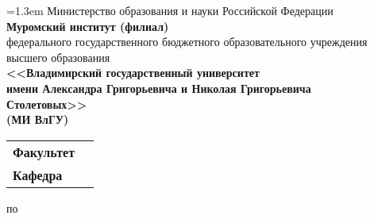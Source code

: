 \newlength{\frontpagefk} %
\setlength{\frontpagefk}{6cm}
\newlength{\frontpagerb} %
\setlength{\frontpagerb}{6cm}
\newlength{\frontpagerbspace} %
\setlength{\frontpagerbspace}{1cm}
\newlength{\FrontPageSubjSpace} %
\setlength{\FrontPageSubjSpace}{1cm}
\newlength{\FrontPageTopicSpace} %
\setlength{\FrontPageTopicSpace}{0.5cm}

\thispagestyle{empty}
\begin{center}
{
\vspace*{-1.5cm}
\baselineskip=1.3em
{\small Министерство образования и науки Российской Федерации}\\
\textbf{Муромский институт (филиал)}\\
{\footnotesize федерального государственного бюджетного образовательного учреждения\\
высшего образования}\\
\textbf{<<Владимирский государственный университет\\
имени Александра Григорьевича и Николая Григорьевича\\
Столетовых>>\\
(МИ ВлГУ)\\}
}

\bigskip
\begin{tabular}{l c}
\textbf{Факультет}&\underline{\makebox[\frontpagefk]{\FrontPageDepartment}}\\
\textbf{Кафедра}&\underline{\makebox[\frontpagefk]{\FrontPageSubdepartment}}\\
\end{tabular}

\vspace{\fill}
\begin{Huge}
\textsl{\WorkType}
\end{Huge}

\vspace{\fill}
по \underline{\makebox[\FrontPageSubjSpace]{}\Subject\makebox[\FrontPageSubjSpace]{}}

\smallskip
\parbox{15cm}{}

\vspace{\fill}

\begin{flushright}


\end{flushright}
\end{center}
